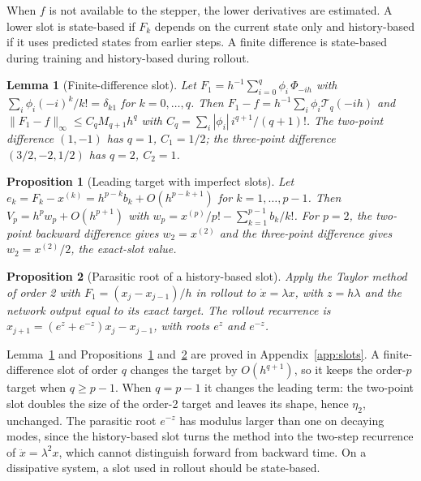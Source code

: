 \documentclass[11pt]{article}
\newtheorem{lemma}{Lemma}
\newtheorem{proposition}{Proposition}
\theoremstyle{definition}
\theoremstyle{remark}
\newcommand{\Rem}{\mathcal{T}}
\begin{document}
When $f$ is not available to the stepper, the lower derivatives are estimated.
A lower slot is state-based if $F_k$ depends on the current state only and history-based if it uses predicted states from earlier steps.
A finite difference is state-based during training and history-based during rollout.

\begin{lemma}[Finite-difference slot]\label{lem:fd}
Let $F_1 = h^{-1}\sum_{i=0}^q\phi_i\,\Phi_{-ih}$ with $\sum_i\phi_i(-i)^k/k! = \delta_{k1}$ for $k = 0,\dots,q$.
Then $F_1 - f = h^{-1}\sum_i\phi_i\Rem_q(-ih)$ and $\|F_1 - f\|_\infty \le C_qM_{q+1}h^q$ with $C_q = \sum_i|\phi_i|\,i^{q+1}/(q+1)!$.
The two-point difference $(1,-1)$ has $q = 1$, $C_1 = 1/2$; the three-point difference $(3/2,-2,1/2)$ has $q = 2$, $C_2 = 1$.
\end{lemma}

\begin{proposition}[Leading target with imperfect slots]\label{prop:leading}
Let $e_k = F_k - x^{(k)} = h^{p-k}b_k + O(h^{p-k+1})$ for $k = 1,\dots,p-1$.
Then $V_p = h^p w_p + O(h^{p+1})$ with $w_p = x^{(p)}/p! - \sum_{k=1}^{p-1}b_k/k!$.
For $p = 2$, the two-point backward difference gives $w_2 = x^{(2)}$ and the three-point difference gives $w_2 = x^{(2)}/2$, the exact-slot value.
\end{proposition}

\begin{proposition}[Parasitic root of a history-based slot]\label{prop:parasitic}
Apply the Taylor method of order 2 with $F_1 = (x_j - x_{j-1})/h$ in rollout to $\dot x = \lambda x$, with $z = h\lambda$ and the network output equal to its exact target.
The rollout recurrence is $x_{j+1} = (e^z + e^{-z})x_j - x_{j-1}$, with roots $e^z$ and $e^{-z}$.
\end{proposition}

Lemma~\ref{lem:fd} and Propositions~\ref{prop:leading} and~\ref{prop:parasitic} are proved in Appendix~\ref{app:slots}.
A finite-difference slot of order $q$ changes the target by $O(h^{q+1})$, so it keeps the order-$p$ target when $q \ge p-1$.
When $q = p-1$ it changes the leading term: the two-point slot doubles the size of the order-2 target and leaves its shape, hence $\eta_2$, unchanged.
The parasitic root $e^{-z}$ has modulus larger than one on decaying modes, since the history-based slot turns the method into the two-step recurrence of $\ddot x = \lambda^2 x$, which cannot distinguish forward from backward time.
On a dissipative system, a slot used in rollout should be state-based.
\end{document}
